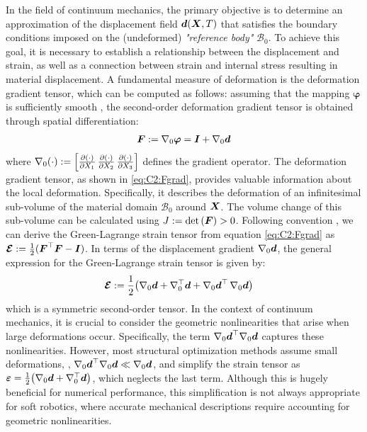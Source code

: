 In the field of continuum mechanics, the primary objective is to determine an approximation of the displacement field ${\boldsymbol{d}}({\boldsymbol{X}},T)$ that satisfies the boundary conditions imposed on the (undeformed) \textit{"reference body"} $\mathcal{B}_0$. To achieve this goal, it is necessary to establish a relationship between the displacement and strain, as well as a connection between strain and internal stress resulting in material displacement. A fundamental measure of deformation is the deformation gradient tensor, which can be computed as follows: assuming that the mapping $\boldsymbol{\varphi}$ is sufficiently smooth \cite{Kim2018,Holzapfel2002}, the second-order deformation gradient tensor is obtained through spatial differentiation:
%
\begin{align}
\boldsymbol{F} :=  \nabla_0 \boldsymbol{\varphi} = \boldsymbol{I} + \nabla_0 {\boldsymbol{d}}
\label{eq:C2:Fgrad}
\end{align}
%
where $\nabla_0 (\cdot):= \left[\frac{\partial (\cdot)}{\partial X_1}\, \frac{\partial (\cdot)}{\partial X_2}\, \frac{\partial (\cdot)}{\partial X_3}\right]$ defines the gradient operator. The deformation gradient tensor, as shown in \eqref{eq:C2:Fgrad}, provides valuable information about the local deformation. Specifically, it describes the deformation of an infinitesimal sub-volume of the material domain $\mathcal{B}_0$ around ${\boldsymbol{X}}$. The volume change of this sub-volume can be calculated using $J := \textnormal{det}\left( {{\boldsymbol{F}}} \right) > 0$. Following convention \cite{Kim2018,Holzapfel2002}, we can derive the Green-Lagrange strain tensor from equation \eqref{eq:C2:Fgrad} as ${\boldsymbol{\mathcal{E}}} : = \frac{1}{2}({\boldsymbol{F}}^\top {\boldsymbol{F}} - \boldsymbol{I})$. In terms of the displacement gradient $\nabla_{0} {\boldsymbol{d}}$, the general expression for the Green-Lagrange strain tensor is given by:
%
\begin{align}
\boldsymbol{\mathcal{E}} & := \frac{1}{2}\big( \nabla_0 {\boldsymbol{d}}  +\nabla_0^\top {\boldsymbol{d}}  + \nabla_0 {\boldsymbol{d}}^\top \, \nabla_0 {\boldsymbol{d}} \big)
\label{eq:E_tens}
\end{align}
%
which is a symmetric second-order tensor. In the context of continuum mechanics, it is crucial to consider the geometric nonlinearities that arise when large deformations occur. Specifically, the term $\nabla_0 {\boldsymbol{d}}^\top \nabla_0 {\boldsymbol{d}}$ captures these nonlinearities. However, most structural optimization methods assume small deformations, \ie, $\nabla_0 {\boldsymbol{d}}^\top \nabla_0 {\boldsymbol{d}} \ll \nabla_0 {\boldsymbol{d}}$, and simplify the strain tensor as $\boldsymbol{\varepsilon} = \tfrac{1}{2}\big( \nabla_0 {\boldsymbol{d}} + \nabla_0^\top {\boldsymbol{d}} \big)$, which neglects the last term. Although this is hugely beneficial for numerical performance, this simplification is not always appropriate for soft robotics, where accurate mechanical descriptions require accounting for geometric nonlinearities.

